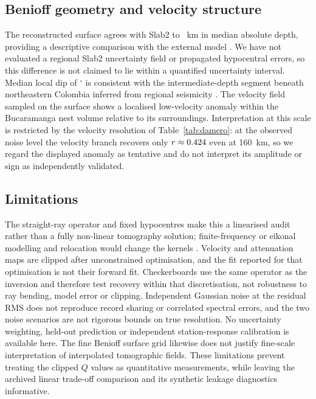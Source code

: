 \documentclass[review,authoryear,longtitle]{elsarticle}
\begin{document}
\subsection{Benioff geometry and velocity structure}

The reconstructed surface agrees with Slab2 to \slabDifAbs~km in median
absolute depth, providing a descriptive comparison with the external model
\citep{Hayes2018Slab2}. We have not evaluated a regional Slab2 uncertainty
field or propagated hypocentral errors, so this difference is not claimed
to lie within a quantified uncertainty interval.
Median local dip of \losaBuzamiento$^{\circ}$ is consistent with the
intermediate-depth segment beneath northeastern Colombia inferred from
regional seismicity \citep{Zarifi2007,SepulvedaJaimes2018,Syracuse2016}.
The velocity field sampled on the surface shows a localised low-velocity
anomaly within the Bucaramanga nest volume relative to its surroundings.
Interpretation at this scale is restricted by the velocity resolution of
Table~\ref{tab:damero}: at the observed noise level the velocity branch
recovers only $r\approx0.424$ even at \SI{160}{\kilo\metre}, so we
regard the displayed anomaly as tentative and do not interpret its
amplitude or sign as independently validated.

\subsection{Limitations}

The straight-ray operator and fixed hypocentres make this a linearised
audit rather than a fully non-linear tomography solution; finite-frequency
or eikonal modelling and relocation would change the kernels
\citep{Sethian1996,Zhao2005,Vavrycuk2012eikonal,Thurber1992}.
Velocity and attenuation maps are clipped after unconstrained optimisation,
and the fit reported for that optimisation is not their forward fit.
Checkerboards use the same operator as the inversion and therefore test
recovery within that discretisation, not robustness to ray bending,
model error or clipping. Independent Gaussian noise at the residual RMS
does not reproduce record sharing or correlated spectral errors, and
the two noise scenarios are not rigorous bounds on true resolution.
No uncertainty weighting, held-out prediction or independent station-response
calibration is available here. The fine Benioff surface grid likewise does
not justify fine-scale interpretation of interpolated tomographic fields.
These limitations prevent treating the clipped $Q$ values as quantitative
measurements, while leaving the archived linear trade-off comparison
and its synthetic leakage diagnostics informative.
\end{document}
